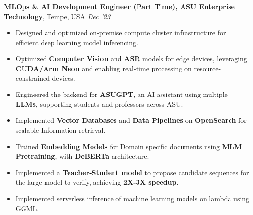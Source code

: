 \documentclass[10pt,a4]{article}
\begin{document}
{\begin{flushleft}
    \vspace{1.5mm}
    \hspace{1.5mm} \textbf{\large MLOps \& AI Development Engineer (Part Time), ASU Enterprise Technology},   Tempe, USA \hfill \textit{\large Dec '23}	\\
    \begin{itemize}
        \item Designed and optimized on-premise compute cluster infrastructure for efficient deep learning model inferencing.
        \item Optimized \textbf{Computer Vision} and \textbf{ASR} models for edge devices, leveraging \textbf{CUDA/Arm Neon} and enabling real-time processing on resource-constrained devices.
        \item Engineered the backend for \textbf{ASUGPT}, an AI assistant using multiple \textbf{LLMs}, supporting students and professors across ASU.
        \item Implemented \textbf{Vector Databases} and \textbf{Data Pipelines} on \textbf{OpenSearch} for scalable Information retrieval.
        \item Trained \textbf{Embedding Models} for Domain specific documents using \textbf{MLM Pretraining}, with  \textbf{DeBERTa} architecture.
        \item Implemented a \textbf{Teacher-Student model} to propose candidate sequences for the large model to verify, achieving \textbf{2X-3X speedup}.
        \item Implemented serverless inference of machine learning models on lambda using GGML.
    \end{itemize}


\end{flushleft}}
\end{document}
